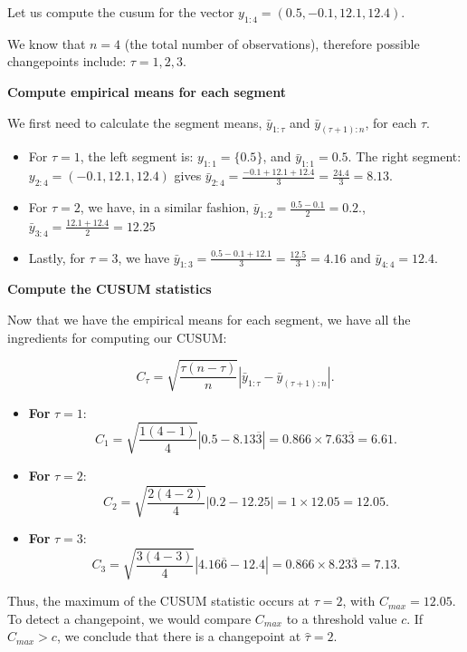 \documentclass[
  letterpaper,
  DIV=11,
  numbers=noendperiod]{scrreprt}
\begin{document}
Let us compute the cusum for the vector
\(y_{1:4} = (0.5, -0.1, 12.1, 12.4)\).

We know that \(n = 4\) (the total number of observations), therefore
possible changepoints include: \(\tau = 1, 2, 3\).

\textbf{Compute empirical means for each segment}

We first need to calculate the segment means, \(\bar{y}_{1:\tau}\) and
\(\bar{y}_{(\tau+1):n}\), for each \(\tau\).

\begin{itemize}
\item
  For \(\tau = 1\), the left segment is: \(y_{1:1} = \{0.5\}\), and
  \(\bar{y}_{1:1} = 0.5.\) The right segment:
  \(y_{2:4} = (-0.1, 12.1, 12.4)\) gives
  \(\bar{y}_{2:4} = \frac{-0.1 + 12.1 + 12.4}{3} = \frac{24.4}{3} = 8.13.\)
\item
  For \(\tau = 2\), we have, in a similar fashion,
  \(\bar{y}_{1:2} = \frac{0.5 - 0.1}{2} = 0.2.\),
  \(\bar{y}_{3:4} = \frac{12.1 + 12.4}{2} = 12.25\)
\item
  Lastly, for \(\tau = 3\), we have
  \(\bar{y}_{1:3} = \frac{0.5 - 0.1 + 12.1}{3} = \frac{12.5}{3} = 4.16\)
  and \(\bar{y}_{4:4} = 12.4\).
\end{itemize}

\textbf{Compute the CUSUM statistics}

Now that we have the empirical means for each segment, we have all the
ingredients for computing our CUSUM:

\[
C_{\tau} = \sqrt{\frac{\tau(n-\tau)}{n}} \left| \bar{y}_{1:\tau} - \bar{y}_{(\tau+1):n} \right|.
\]

\begin{itemize}
\item
  \textbf{For} \(\tau = 1\): \[
  C_1 = \sqrt{\frac{1(4-1)}{4}} \left| 0.5 - 8.13\overline{3} \right| = 0.866 \times 7.63\overline{3} = 6.61.
  \]
\item
  \textbf{For} \(\tau = 2\): \[
  C_2 = \sqrt{\frac{2(4-2)}{4}} \left| 0.2 - 12.25 \right| = 1 \times 12.05 = 12.05.
  \]
\item
  \textbf{For} \(\tau = 3\): \[
  C_3 = \sqrt{\frac{3(4-3)}{4}} \left| 4.16\overline{6} - 12.4 \right| = 0.866 \times 8.23\overline{3} = 7.13.
  \]
\end{itemize}

Thus, the maximum of the CUSUM statistic occurs at \(\tau = 2\), with
\(C_{max} = 12.05\). To detect a changepoint, we would compare
\(C_{max}\) to a threshold value \(c\). If \(C_{max} > c\), we conclude
that there is a changepoint at \(\hat{\tau} = 2\).
\end{document}
